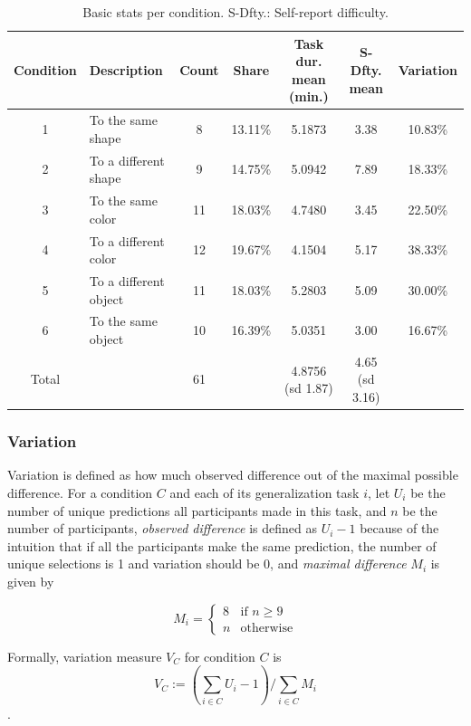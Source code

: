 \documentclass{article}
\begin{document}
\begin{table}[h!]
  \centering
  \begin{tabular}{c|l|c|c|c|c|c}
  Condition & Description & Count & Share & Task dur. mean (min.) & S-Dfty. mean & Variation \\
  \hline
  1        & To the same shape     & 8     & 13.11\% & 5.1873 & 3.38 & 10.83\% \\
  2        & To a different shape  & 9     & 14.75\% & 5.0942 & 7.89 & 18.33\% \\
  3        & To the same color     & 11    & 18.03\% & 4.7480 & 3.45 & 22.50\% \\
  4        & To a different color  & 12    & 19.67\% & 4.1504 & 5.17 & 38.33\% \\
  5        & To a different object & 11    & 18.03\% & 5.2803 & 5.09 & 30.00\% \\
  6        & To the same object    & 10    & 16.39\% & 5.0351 & 3.00 & 16.67\% \\
  \hline
  Total    &                       & 61    &         & 4.8756 (sd 1.87) & 4.65 (sd 3.16) & \\
  \end{tabular}
  \caption{Basic stats per condition. S-Dfty.: Self-report difficulty.}
  \label{table:conditions}
\end{table}

\subsubsection*{Variation}

Variation is defined as how much observed difference out of the maximal possible difference.
%
For a condition $C$ and each of its generalization task $i$, let $U_i$ be the number of unique predictions all participants made in this task, and $n$ be the number of participants, \emph{observed difference} is defined as $U_i - 1$ because of the intuition that if all the participants make the same prediction, the number of unique selections is 1 and variation should be 0, and \emph{maximal difference} $M_i$ is given by

\[M_i=
  \begin{cases}
    8 & \text{if } n \geq 9 \\
    n & \text{otherwise}
  \end{cases}
\]

Formally, variation measure $V_C$ for condition $C$ is $$V_C := (\sum_{i \in C}U_i-1)/\sum_{i \in C}M_i$$.
\end{document}
